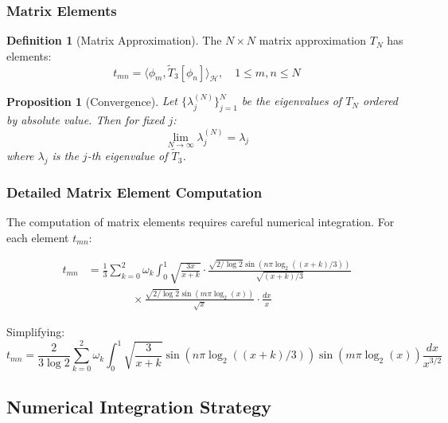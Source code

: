 \documentclass[12pt,letterpaper]{article}
\theoremstyle{plain}
\newtheorem{proposition}[theorem]{Proposition}
\theoremstyle{definition}
\newtheorem{definition}[theorem]{Definition}
\theoremstyle{remark}
\newcommand{\inner}[2]{\langle #1, #2 \rangle}
\newcommand{\hilbert}{\mathcal{H}}
\newcommand{\modifiedop}{\tilde{T}_3}
\begin{document}
\subsubsection{Matrix Elements}

\begin{definition}[Matrix Approximation]\label{def:matrix_approx}
The $N \times N$ matrix approximation $T_N$ has elements:
\begin{equation}
t_{mn} = \inner{\phi_m}{\modifiedop[\phi_n]}_{\hilbert}, \quad 1 \leq m,n \leq N
\end{equation}
\end{definition}

\begin{proposition}[Convergence]\label{prop:matrix_convergence}
Let $\{\lambda_j^{(N)}\}_{j=1}^N$ be the eigenvalues of $T_N$ ordered by absolute value. Then for fixed $j$:
\begin{equation}
\lim_{N \to \infty} \lambda_j^{(N)} = \lambda_j
\end{equation}
where $\lambda_j$ is the $j$-th eigenvalue of $\modifiedop$.
\end{proposition}

\subsubsection{Detailed Matrix Element Computation}

The computation of matrix elements requires careful numerical integration. For each element $t_{mn}$:

\begin{align}
t_{mn} &= \frac{1}{3}\sum_{k=0}^{2} \omega_k \int_0^1 \sqrt{\frac{3x}{x+k}} \cdot \frac{\sqrt{2/\log 2} \sin(n\pi\log_2((x+k)/3))}{\sqrt{(x+k)/3}}\\
&\quad\quad\quad\quad \times \frac{\sqrt{2/\log 2} \sin(m\pi\log_2(x))}{\sqrt{x}} \cdot \frac{dx}{x}
\end{align}

Simplifying:
\begin{equation}
t_{mn} = \frac{2}{3\log 2} \sum_{k=0}^{2} \omega_k \int_0^1 \sqrt{\frac{3}{x+k}} \sin(n\pi\log_2((x+k)/3)) \sin(m\pi\log_2(x)) \frac{dx}{x^{3/2}}
\end{equation}

\subsection{Numerical Integration Strategy}
\end{document}
